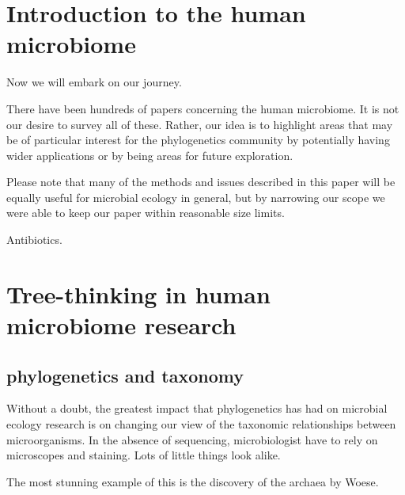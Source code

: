 \documentclass{amsart}
\begin{document}
\section{Introduction to the human microbiome}


Now we will embark on our journey.

There have been hundreds of papers concerning the human microbiome. It
is not our desire to survey all of these. Rather, our idea is to
highlight areas that may be of particular interest for the
phylogenetics community by potentially having wider applications or by
being areas for future exploration.

Please note that many of the methods and issues described in this paper will be equally useful for microbial ecology in general, but by narrowing our scope we were able to keep our paper within reasonable size limits.

Antibiotics.
\cite{dethlefsen2008pervasive,dethlefsen2011incomplete,jakobsson2010short,jernberg2007long}


\section{Tree-thinking in human microbiome research}

\subsection{phylogenetics and taxonomy}

Without a doubt, the greatest impact that phylogenetics has had on microbial ecology research is on changing our view of the taxonomic relationships between microorganisms.
In the absence of sequencing, microbiologist have to rely on microscopes and staining.
Lots of little things look alike.

The most stunning example of this is the discovery of the archaea by Woese.
\end{document}
